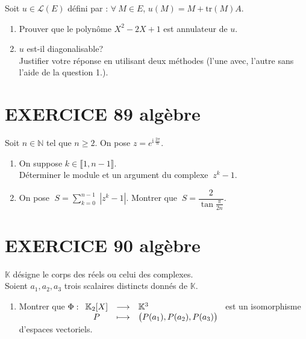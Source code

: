 \documentclass[10pt,oneside]{article}
\begin{document}
\begin{flushleft}
\begin{enumerate}
Soit $u\in\mathcal{L}\left(E\right) $ défini par : $\forall\:M\in E$, $u(M)=M+\mathrm{tr} (M)A$. \\
\begin{enumerate}
\item
Prouver que le polynôme $X^2-2X+1$ est annulateur de $u$.
\item
$u$ est-il diagonalisable?\\
Justifier votre réponse en utilisant deux méthodes (l'une avec, l'autre sans l'aide de la question 1.).

\end{enumerate}
\end{enumerate}
 

 \section*{EXERCICE 89 \: algèbre  }
 


                       
 Soit $n \in {\mathbb{N}}$ tel que $n\geqslant 2$. On pose $z = e^{\mathrm{i}\,\frac{2\pi}{n}}$.
\begin{enumerate}
 \item On suppose $k\in {\llbracket 1,n-1\rrbracket}$. \\Déterminer le module et un argument du complexe $\:z^k - 1$.
 \item On pose $\;S = \displaystyle\sum\limits_{k=0}^{n-1} \;\left|z^k - 1\right|$. Montrer que $\:S = \dfrac{2}{\tan\frac{\pi}{2n}}$.
 
 \end{enumerate}\vspace{0.2cm}
 



 \section*{EXERCICE 90 \: algèbre }


$\mathbb K$ désigne le corps des réels ou celui des complexes.\\
Soient $a_{1}, a_{2}, a_{3}$ trois scalaires distincts donnés de $\mathbb K$.

\begin{enumerate}
\item Montrer que $\Phi:\begin{array}[t]{ccc}
\mathbb K_{2}[X] & \longrightarrow & \mathbb K^{3} \hfill\\ 
P & \longmapsto & \big(P(a_{1}),P(a_{2}),P(a_{3})\big) \\
\end{array}$ est un isomorphisme d'espaces vectoriels.


\end{enumerate}
\end{flushleft}
\end{document}
